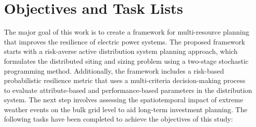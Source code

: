 \section{Objectives and Task Lists}
The major goal of this work is to create a framework for multi-resource planning that improves the resilience of electric power systems. The proposed framework starts with a risk-averse active distribution system planning approach, which formulates the distributed siting and sizing problem using a two-stage stochastic programming method. Additionally, the framework includes a risk-based probabilistic resilience metric that uses a multi-criteria decision-making process to evaluate attribute-based and performance-based parameters in the distribution system. The next step involves assessing the spatiotemporal impact of extreme weather events on the bulk grid level to aid long-term investment planning. The following tasks have been completed to achieve the objectives of this study: 

